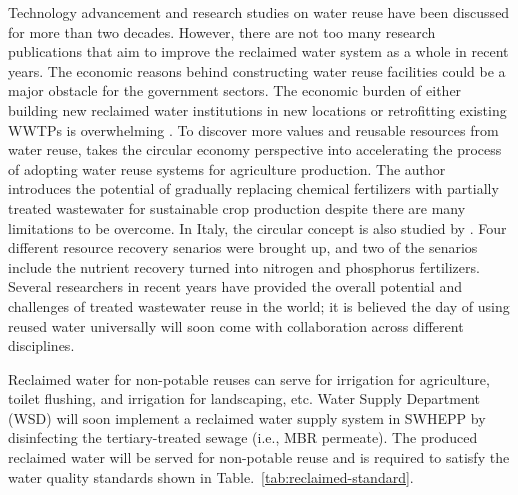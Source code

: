 Technology advancement and research studies on water reuse have been discussed for more than two decades. However, there are not too many research publications that aim to improve the reclaimed water system as a whole in recent years. The economic reasons behind constructing water reuse facilities could be a major obstacle for the government sectors. The economic burden of either building new reclaimed water institutions in new locations or retrofitting existing WWTPs is overwhelming \citep{adewumiTreatedWastewaterReuse2010}. To discover more values and reusable resources from water reuse, \citet{chojnackaTransitionConventionalIrrigation2020} takes the circular economy perspective into accelerating the process of adopting water reuse systems for agriculture production. The author introduces the potential of gradually replacing chemical fertilizers with partially treated wastewater for sustainable crop production despite there are many limitations to be overcome. In Italy, the circular concept is also studied by \citet{colellaChallengesOpportunitiesMore2021}. Four different resource recovery senarios were brought up, and two of the senarios include the nutrient recovery turned into nitrogen and phosphorus fertilizers. Several researchers in recent years have provided the overall potential and challenges of treated wastewater reuse in the world; it is believed the day of using reused water universally will soon come with collaboration across different disciplines. 


Reclaimed water for non-potable reuses can serve for irrigation for agriculture, toilet flushing, and irrigation for landscaping, etc. Water Supply Department (WSD) will soon implement a reclaimed water supply system in SWHEPP by disinfecting the tertiary-treated sewage (i.e., MBR permeate). The produced reclaimed water will be served for non-potable reuse and is required to satisfy the water quality standards shown in Table.~\ref{tab:reclaimed-standard}.

